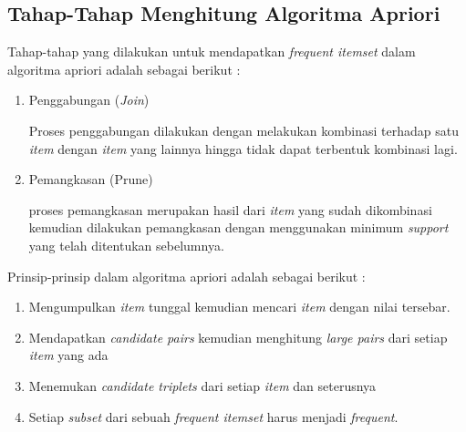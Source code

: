\subsection{Tahap-Tahap Menghitung Algoritma Apriori}
Tahap-tahap yang dilakukan untuk mendapatkan \textit{frequent itemset} dalam algoritma apriori adalah sebagai berikut \cite{triyanto2014association}:
 \begin{enumerate}
\item Penggabungan (\textit{Join})
\par Proses penggabungan dilakukan dengan melakukan kombinasi terhadap satu \textit{item} dengan \textit{item} yang lainnya hingga tidak dapat terbentuk kombinasi lagi.
\item Pemangkasan (Prune)
\par proses pemangkasan merupakan hasil dari \textit{item} yang sudah dikombinasi kemudian dilakukan pemangkasan dengan menggunakan minimum \textit{support} yang telah ditentukan sebelumnya. 
\end{enumerate}

\par Prinsip-prinsip dalam algoritma apriori adalah sebagai berikut \cite{tampubolon2013implementasi}:
 \begin{enumerate}
\item Mengumpulkan \textit{item} tunggal kemudian mencari \textit{item} dengan nilai tersebar.
\item Mendapatkan \textit{candidate pairs} kemudian menghitung \textit{large pairs} dari setiap \textit{item} yang ada
\item Menemukan \textit{candidate triplets} dari setiap \textit{item} dan seterusnya
\item Setiap \textit{subset} dari sebuah \textit{frequent itemset} harus menjadi \textit{frequent}.
\end{enumerate}

